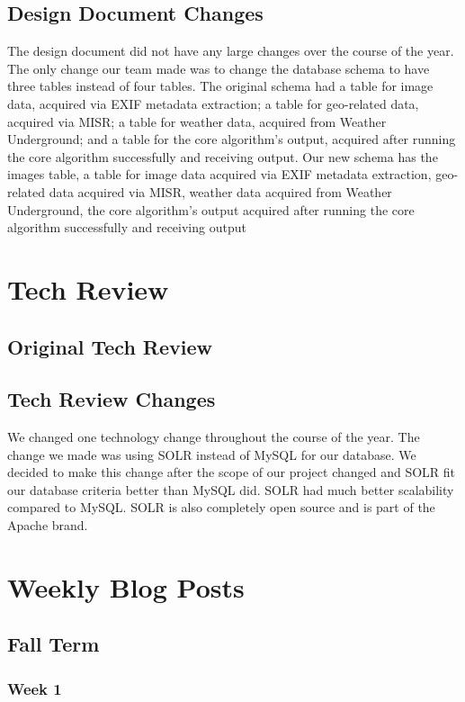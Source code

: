 \documentclass[onecolumn, draftclsnofoot,10pt, compsoc]{IEEEtran}
\begin{document}
\begin{flushleft}
\subsection{Design Document Changes} 
The design document did not have any large changes over the course of the year. The only change our team made was to change the database schema to have three tables instead of four tables. The original schema had a table for image data, acquired via EXIF metadata extraction; a table for geo-related data, acquired via MISR; a table for weather data, acquired from Weather Underground; and a table for the core algorithm's output, acquired after running the core algorithm successfully and receiving output. Our new schema has the images table, a table for image data acquired via EXIF metadata extraction, geo-related data acquired via MISR, weather data acquired from Weather Underground, the core algorithm's output acquired after running the core algorithm successfully and receiving output
 
\section{Tech Review}
\subsection{Original Tech Review}

 
\subsection{Tech Review Changes} 
We changed one technology change throughout the course of the year. The change we made was using SOLR instead of MySQL for our database. We decided to make this change after the scope of our project changed and SOLR fit our database criteria better than MySQL did. SOLR had much better scalability compared to MySQL. SOLR is also completely open source and is part of the Apache brand.
 
 
\section{Weekly Blog Posts} 
\subsection{Fall Term}
\subsubsection{Week 1}

\end{flushleft}
\end{document}
